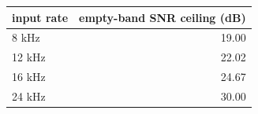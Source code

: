 \begin{tabular}{lr}
\toprule
input rate & empty-band SNR ceiling (dB) \\
\midrule
8 kHz & 19.00 \\
12 kHz & 22.02 \\
16 kHz & 24.67 \\
24 kHz & 30.00 \\
\bottomrule
\end{tabular}
